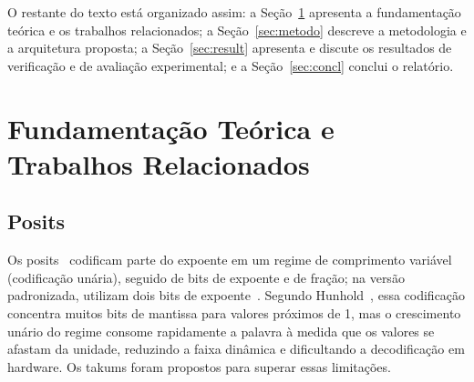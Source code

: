 \documentclass[journal]{IEEEtran}
\begin{document}
O restante do texto está organizado assim: a Seção~\ref{sec:fund} apresenta
a fundamentação teórica e os trabalhos relacionados; a
Seção~\ref{sec:metodo} descreve a metodologia e a arquitetura proposta; a
Seção~\ref{sec:result} apresenta e discute os resultados de verificação e de
avaliação experimental; e a Seção~\ref{sec:concl} conclui o relatório.

\section{Fundamentação Teórica e Trabalhos Relacionados}
\label{sec:fund}

\subsection{Posits}
Os posits~\cite{gustafson2017} codificam parte do expoente em um regime de
comprimento variável (codificação unária), seguido de bits de expoente e de
fração; na versão padronizada, utilizam dois bits de expoente~\cite{hunhold2024beating}.
Segundo Hunhold~\cite{hunhold2024beating}, essa codificação concentra muitos
bits de mantissa para valores próximos de 1, mas o crescimento unário do
regime consome rapidamente a palavra à medida que os valores se afastam da
unidade, reduzindo a faixa dinâmica e dificultando a decodificação em hardware.
Os takums foram propostos para superar essas limitações.
\end{document}
